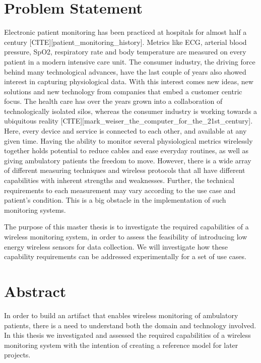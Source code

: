 \begin{preface}

\section{Problem Statement}
Electronic patient monitoring has been practiced at hospitals for almost half a century [CITE][patient_monitoring_history]. Metrics like ECG, arterial blood pressure, SpO2, respiratory rate and body temperature are measured on every patient in a modern intensive care unit. The consumer industry, the driving force behind many technological advances, have the last couple of years also showed interest in capturing physiological data. With this interest comes new ideas, new solutions and new technology from companies that embed a customer centric focus. The health care has over the years grown into a collaboration of technologically isolated silos, whereas the consumer industry is working towards a ubiquitous reality [CITE][mark_weiser_the_computer_for_the_21st_century]. Here, every device and service is connected to each other, and available at any given time. Having the ability to monitor several physiological metrics wirelessly together holds potential to reduce cables and ease everyday routines, as well as giving ambulatory patients the freedom to move. However, there is a wide array of different measuring techniques and wireless protocols that all have different capabilities with inherent strengths and weaknesses. Further, the technical requirements to each measurement may vary according to the use case and patient's condition. This is a big obstacle in the implementation of such monitoring systems.

The purpose of this master thesis is to investigate the required capabilities of a wireless monitoring system, in order to assess the feasibility of introducing low energy wireless sensors for data collection. We will investigate how these capability requirements can be addressed experimentally for a set of use cases.

\section{Abstract}
In order to build an artifact that enables wireless monitoring of ambulatory patients, there is a need to understand both the domain and technology involved. In this thesis we investigated and assessed the required capabilities of a wireless monitoring system with the intention of creating a reference model for later projects. 


\end{preface}

